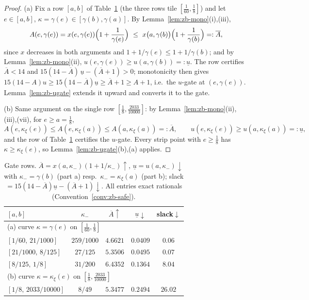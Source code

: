 \documentclass[11pt]{article}
\theoremstyle{remark}
\theoremstyle{plain}
\theoremstyle{plain}
\newcommand{\kxi}{\kappa_\xi}
\begin{document}
\begin{proof}
(a) Fix a row $[a,b]$ of Table~\ref{tab:gate} (the three rows tile
$[\tfrac1{60},\tfrac18]$) and let $e\in[a,b]$, $\kappa=\gamma(e)\in
[\gamma(b),\gamma(a)]$.  By Lemma~\ref{lem:zb-mono}(i),(iii),
\[
        A(e,\gamma(e))=x(e,\gamma(e))\Bigl(1+\frac1{\gamma(e)}\Bigr)
        \ \le\ x\bigl(a,\gamma(b)\bigr)\Bigl(1+\frac1{\gamma(b)}\Bigr)
        =:\overline A,
\]
since $x$ decreases in both arguments and $1+1/\gamma(e)\le1+1/\gamma(b)$;
and by Lemma~\ref{lem:zb-mono}(ii),
$u(e,\gamma(e))\ge u(a,\gamma(b))=:\underline u$.
The row certifies $\overline A<14$ and
$15(14-\overline A)\,\underline u-(\overline A+1)>0$; monotonicity then
gives $15(14-A)u\ge15(14-\overline A)\underline u\ge\overline A+1\ge A+1$,
i.e.\ the $u$-gate at $(e,\gamma(e))$.  Lemma~\ref{lem:zb-ugate} extends it
upward and converts it to the gate.

(b) Same argument on the single row $[\tfrac18,\tfrac{2033}{10000}]$: by
Lemma~\ref{lem:zb-mono}(ii),(iii),(vii), for $e\ge a=\tfrac18$,
\[
        A(e,\kxi(e))\le A(e,\kxi(a))\le A(a,\kxi(a))=:\overline A,
        \qquad
        u(e,\kxi(e))\ge u(a,\kxi(a))=:\underline u ,
\]
and the row of Table~\ref{tab:gate} certifies the $u$-gate.  Every strip
point with $e\ge\tfrac18$ has $\kappa\ge\kxi(e)$, so
Lemma~\ref{lem:zb-ugate}(b),(a) applies.
\end{proof}

\begin{table}[h]\centering
\caption{Gate rows.  $\overline A{=}x(a,\kappa_-)(1{+}1/\kappa_-)\uparrow$,
$\underline u{=}u(a,\kappa_-)\downarrow$ with $\kappa_-=\gamma(b)$ (part a)
resp.\ $\kappa_-=\kxi(a)$ (part b); slack
$=15(14-\overline A)\underline u-(\overline A+1)\downarrow$.  All entries
exact rationals (Convention~\ref{conv:zb-safe}).}\label{tab:gate}
\begin{tabular}{lcccc}
\toprule
$[a,b]$ & $\kappa_-$ & $\overline A\uparrow$ & $\underline u\downarrow$ & slack$\downarrow$\\
\midrule
\multicolumn{5}{l}{(a) curve $\kappa=\gamma(e)$ on $[\tfrac1{60},\tfrac18]$}\\
$[1/60,\,21/1000]$ & $259/1000$ & $4.6621$ & $0.0409$ & $0.06$ \\
$[21/1000,\,8/125]$ & $27/125$ & $5.3506$ & $0.0495$ & $0.07$ \\
$[8/125,\,1/8]$ & $31/200$ & $6.4352$ & $0.1364$ & $8.04$ \\
\midrule
\multicolumn{5}{l}{(b) curve $\kappa=\kxi(e)$ on $[\tfrac18,\tfrac{2033}{10000}]$}\\
$[1/8,\,2033/10000]$ & $8/49$ & $5.3477$ & $0.2494$ & $26.02$ \\
\bottomrule
\end{tabular}
\end{table}
\end{document}
